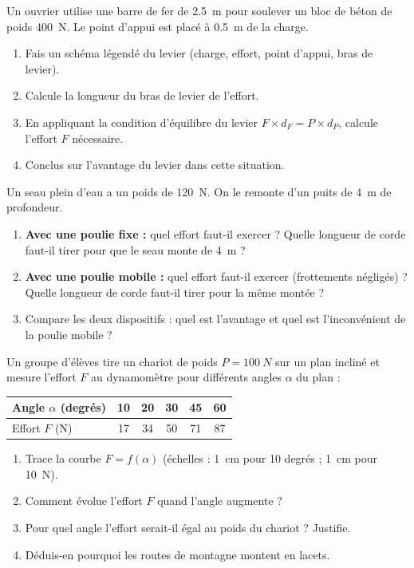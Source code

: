 \documentclass[11pt]{article}
\newcounter{popsec}
\newcounter{popsub}
\newcommand{\courssub}[1]{%
  \stepcounter{popsub}%
  \par\vspace{9pt}\noindent{\popxbold\fontsize{11.5}{13}\selectfont\color{popink}{\color{poporange}\thepopsec.\thepopsub}\hspace{6pt}#1}\par\nopagebreak\vspace{4pt}
}
\begin{document}
\courssub{Je m'entraîne}

\begin{exercice}
Un ouvrier utilise une barre de fer de \SI{2,5}{m} pour soulever un bloc de béton de poids \SI{400}{N}. Le point d'appui est placé à \SI{0,5}{m} de la charge.
\begin{enumerate}
\item Fais un schéma légendé du levier (charge, effort, point d'appui, bras de levier).
\item Calcule la longueur du bras de levier de l'effort.
\item En appliquant la condition d'équilibre du levier $F \times d_F = P \times d_P$, calcule l'effort $F$ nécessaire.
\item Conclus sur l'avantage du levier dans cette situation.
\end{enumerate}
\end{exercice}

\begin{exercice}
Un seau plein d'eau a un poids de \SI{120}{N}. On le remonte d'un puits de \SI{4}{m} de profondeur.
\begin{enumerate}
\item \textbf{Avec une poulie fixe :} quel effort faut-il exercer ? Quelle longueur de corde faut-il tirer pour que le seau monte de \SI{4}{m} ?
\item \textbf{Avec une poulie mobile :} quel effort faut-il exercer (frottements négligés) ? Quelle longueur de corde faut-il tirer pour la même montée ?
\item Compare les deux dispositifs : quel est l'avantage et quel est l'inconvénient de la poulie mobile ?
\end{enumerate}
\end{exercice}

\begin{exercice}
Un groupe d'élèves tire un chariot de poids $P = \SI{100}{N}$ sur un plan incliné et mesure l'effort $F$ au dynamomètre pour différents angles $\alpha$ du plan :
\begin{center}
\begin{tabular}{|l|c|c|c|c|c|}
\hline
\rowcolor{popblueL} Angle $\alpha$ (degrés) & 10 & 20 & 30 & 45 & 60 \\
\hline Effort $F$ (N) & 17 & 34 & 50 & 71 & 87 \\
\hline
\end{tabular}
\end{center}
\begin{enumerate}
\item Trace la courbe $F = f(\alpha)$ (échelles : \SI{1}{cm} pour 10 degrés ; \SI{1}{cm} pour \SI{10}{N}).
\item Comment évolue l'effort $F$ quand l'angle augmente ?
\item Pour quel angle l'effort serait-il égal au poids du chariot ? Justifie.
\item Déduis-en pourquoi les routes de montagne montent en lacets.
\end{enumerate}
\end{exercice}
\end{document}
